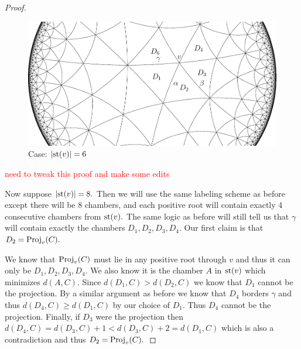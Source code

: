 \documentclass[class=book, crop=false]{standalone}
\begin{document}
\begin{proof}
	\begin{figure}
		\label{deg6433f2}
		\includegraphics{diagrams/deg6433f2.pdf}
		\caption{Case: $|\mathrm{st}(v)|=6$}
	\end{figure}

	
	\textcolor{red}{\Huge need to tweak this proof and make some edits \normalsize}

	Now suppose $|\mathrm{st}(v)|=8.$ Then we will use the same labeling scheme as before except there will be $8$ chambers, and each positive root will contain exactly 4 consecutive chambers from $\mathrm{st}(v).$ The same logic as before will still tell us that $\gamma$ will contain exactly the chambers $D_1,D_2,D_3,D_4.$ Our first claim is that $D_2=\mathrm{Proj}_v(C).$

	We know that $\mathrm{Proj}_v(C)$ must lie in any positive root through $v$ and thus it can only be $D_1,D_2,D_3,D_4.$ We also know it is the chamber $A$ in $\mathrm{st}(v)$ which minimizes $d(A,C).$ Since $d(D_1,C)>d(D_2,C)$ we know that $D_1$ cannot be the projection. By a similar argument as before we know that $D_4$ borders $\gamma$ and thus $d(D_4,C)\ge d(D_1,C)$ by our choice of $D_1.$ Thus $D_4$ cannot be the projection. Finally, if $D_3$ were the projection then $d(D_4,C)=d(D_3,C)+1<d(D_3,C)+2=d(D_1,C)$ which is also a contradiction and thus $D_2=\mathrm{Proj}_v(C).$


\end{proof}
\end{document}
